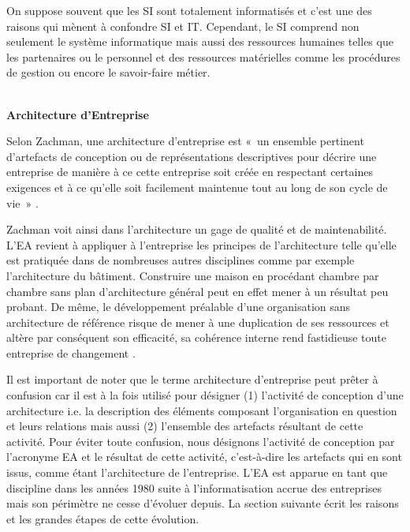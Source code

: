 On suppose souvent que les SI sont totalement informatisés et c'est une des 
raisons qui mènent à confondre SI et IT. Cependant, le SI comprend non seulement 
le système informatique mais aussi des ressources humaines telles que les partenaires ou le personnel et des ressources matérielles comme les procédures de gestion ou encore le savoir-faire métier.
\\\

\textbf{Architecture d'Entreprise}

Selon Zachman, une architecture d'entreprise est «~un ensemble pertinent d'artefacts de conception ou de représentations descriptives pour décrire une entreprise de manière à ce cette entreprise soit créée en respectant certaines exigences et à ce qu'elle soit facilement maintenue tout au long de son cycle de vie~» \cite{zachman1997enterprise}. 

Zachman voit ainsi dans l'architecture un gage de qualité et de maintenabilité. L'EA revient à appliquer à l'entreprise les principes de l'architecture telle qu'elle est pratiquée dans de nombreuses autres disciplines comme par exemple l'architecture du bâtiment. Construire une maison en procédant chambre par chambre sans plan d'architecture général peut en effet mener à un résultat peu probant. De même, le développement préalable d'une organisation sans architecture de référence risque de mener à une duplication de ses ressources et altère par conséquent son efficacité, sa cohérence interne rend fastidieuse toute entreprise de changement \cite{zachman1997enterprise} \cite{bernard2012introduction}. 

Il est important de noter que le terme architecture d'entreprise peut prêter à 
confusion car il est à la fois utilisé pour désigner (1) l'activité de 
conception d'une architecture i.e. la description des éléments composant 
l'organisation en question et leurs relations mais aussi (2) l'ensemble des 
artefacts résultant de cette activité. Pour éviter toute confusion, nous désignons l'activité de conception par l'acronyme EA et le résultat de cette activité, c'est-à-dire les artefacts qui en sont issus, comme étant l'architecture de l'entreprise. L'EA est apparue en tant que discipline dans  les années 1980 suite à l'informatisation accrue des entreprises mais son périmètre ne cesse d'évoluer depuis. La section suivante écrit les raisons et les grandes étapes de cette évolution. 



